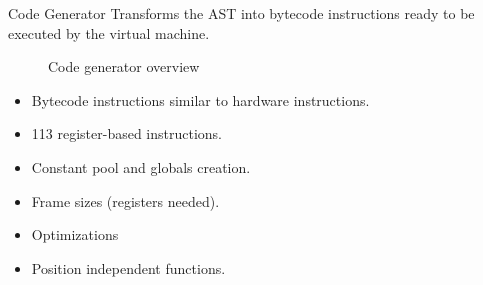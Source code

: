 \begin{slide}
    \begin{block}{Code Generator}
        Transforms the AST into bytecode instructions ready to be executed by the virtual machine.
    \end{block}
    \vfill
    \begin{figure}[H]
        \centering
        \caption{Code generator overview}
    \end{figure}
\end{slide}
\begin{slide}
    \begin{itemize}
        \item Bytecode instructions similar to hardware instructions.
        \item 113 register-based instructions.
        \item Constant pool and globals creation.
        \item Frame sizes (registers needed).
        \item Optimizations
        \item Position independent functions.
    \end{itemize}
\end{slide}

